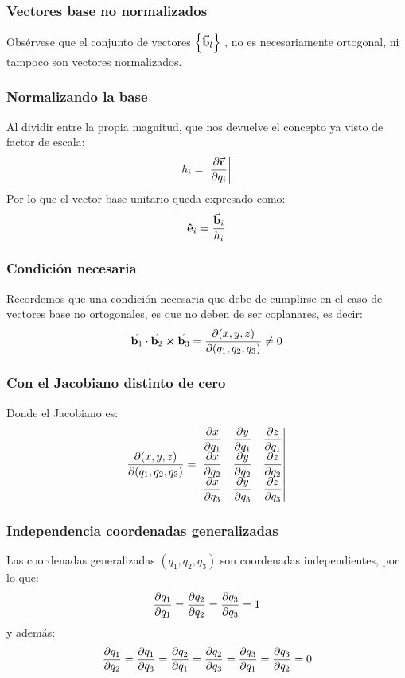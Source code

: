 \documentclass[12pt]{beamer}
\begin{document}
\begin{frame}
\frametitle{Vectores base no normalizados}
Obsérvese que el conjunto de vectores $\left\{ \va{b}_{l} \right\}$ , no es necesariamente ortogonal, ni tampoco son vectores normalizados.
\end{frame}
\begin{frame}
\frametitle{Normalizando la base}
Al dividir entre la propia magnitud, que nos devuelve el concepto ya visto de factor de escala:
\pause
\begin{align*}
h_{i} = \abs{\pdv{\va{r}}{q_{i}}}
\end{align*}
\pause
Por lo que el vector base unitario queda expresado como:
\pause
\begin{align*}
\vu{e}_{i} = \dfrac{\va{b}_{i}}{h_{i}}
\end{align*}
\end{frame}
\begin{frame}
\frametitle{Condición necesaria}
Recordemos que una condición necesaria que debe de cumplirse en el caso de vectores base no ortogonales, es que no deben de ser coplanares, es decir:
\begin{align*}
\va{b}_{1} \cdot \va{b}_{2} \cp \va{b}_{3} = \pdv{(x, y, z)}{(q_{1}, q_{2}, q_{3})} \neq 0
\end{align*}
\end{frame}
\begin{frame}
\frametitle{Con el Jacobiano distinto de cero}
Donde el Jacobiano es:
\begin{align*}
\pdv{(x, y, z)}{(q_{1}, q_{2}, q_{3})} = \mqty|
\displaystyle \pdv{x}{q_{1}} & \displaystyle \pdv{y}{q_{1}} & \displaystyle \pdv{z}{q_{1}} \\[0.5em]
\displaystyle \pdv{x}{q_{2}} & \displaystyle \pdv{y}{q_{2}} & \displaystyle \pdv{z}{q_{2}} \\[0.5em]
\displaystyle \pdv{x}{q_{3}} & \displaystyle \pdv{y}{q_{3}} & \displaystyle \pdv{z}{q_{3}} |
\end{align*}
\end{frame}
\begin{frame}[t]
\frametitle{Independencia coordenadas generalizadas}
Las coordenadas generalizadas $(q_{1}, q_{2}, q_{3})$ son coordenadas independientes, por lo que:
\pause
\begin{align*}
\pdv{q_{1}}{q_{1}} = \pdv{q_{2}}{q_{2}} = \pdv{q_{3}}{q_{3}} = 1
\end{align*}
\pause
y además:
\begin{align*}
\pdv{q_{1}}{q_{2}} = \pdv{q_{1}}{q_{3}} = \pdv{q_{2}}{q_{1}} = \pdv{q_{2}}{q_{3}} = \pdv{q_{3}}{q_{1}} = \pdv{q_{3}}{q_{2}} = 0
\end{align*}
\pause
{}
\end{frame}
\end{document}
